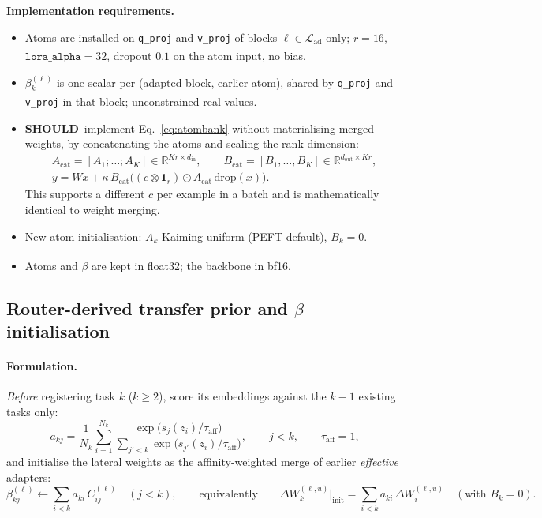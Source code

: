 \documentclass[11pt]{article}
\newcommand{\R}{\mathbb{R}}
\newcommand{\tagthesis}{\textsuperscript{\textcolor{teal!70!black}{\sffamily[thesis]}}}
\newcommand{\tagnew}{\textsuperscript{\textcolor{orange!80!black}{\sffamily[new]}}}
\newcommand{\SHOULD}{\textbf{SHOULD}}
\newcommand{\Ladapt}{\mathcal{L}_{\mathrm{ad}}}
\newcommand{\impl}{\par\noindent\textbf{Implementation requirements.}\ }
\begin{document}
\impl
\begin{itemize}[leftmargin=*]
  \item Atoms are installed on \texttt{q\_proj} and \texttt{v\_proj} of blocks $\ell\in\Ladapt$ only;
        $r=16$, $\texttt{lora\_alpha}=32$, dropout $0.1$ on the atom input, no bias\tagthesis.
  \item $\beta^{(\ell)}_{k}$ is one scalar per (adapted block, earlier atom), shared by \texttt{q\_proj} and
        \texttt{v\_proj} in that block\tagnew; unconstrained real values.
  \item \SHOULD\ implement Eq.~\eqref{eq:atombank} without materialising merged weights, by concatenating
        the atoms and scaling the rank dimension:
        \begin{gather*}
          A_{\mathrm{cat}}=[A_1;\dots;A_K]\in\R^{Kr\times d_{\mathrm{in}}},\qquad
          B_{\mathrm{cat}}=[B_1,\dots,B_K]\in\R^{d_{\mathrm{out}}\times Kr},\\
          y=Wx+\kappa\,B_{\mathrm{cat}}\big((c\otimes\mathbf 1_r)\odot A_{\mathrm{cat}}\,\mathrm{drop}(x)\big).
        \end{gather*}
        This supports a different $c$ per example in a batch and is mathematically identical to weight merging.
  \item New atom initialisation: $A_k$ Kaiming-uniform (PEFT default), $B_k=0$.
  \item Atoms and $\beta$ are kept in float32; the backbone in bf16\tagnew.
\end{itemize}

\subsection{Router-derived transfer prior and $\beta$ initialisation}\label{sec:prior}

\paragraph{Formulation.} \emph{Before} registering task $k$ ($k\ge2$), score its embeddings against the $k-1$
existing tasks only:
\begin{equation}
  a_{kj}=\frac{1}{N_k}\sum_{i=1}^{N_k}\frac{\exp\big(s_j(z_i)/\tau_{\mathrm{aff}}\big)}{\sum_{j'<k}\exp\big(s_{j'}(z_i)/\tau_{\mathrm{aff}}\big)},\qquad j<k,\qquad \tau_{\mathrm{aff}}=1,
\end{equation}
and initialise the lateral weights as the affinity-weighted merge of earlier \emph{effective} adapters:
\begin{equation}
  \beta^{(\ell)}_{kj}\leftarrow\sum_{i<k}a_{ki}\,C^{(\ell)}_{ij}\quad (j<k),\qquad\text{equivalently}\qquad
  \Delta W_k^{(\ell,u)}\big|_{\text{init}}=\sum_{i<k}a_{ki}\,\Delta W_i^{(\ell,u)}\quad(\text{with }B_k=0).
\end{equation}
\end{document}
